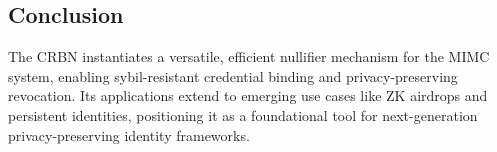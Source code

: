 \subsection{Conclusion}
The CRBN instantiates a versatile, efficient nullifier mechanism for the MIMC system, enabling sybil-resistant credential binding and privacy-preserving revocation. Its applications extend to emerging use cases like ZK airdrops and persistent identities, positioning it as a foundational tool for next-generation privacy-preserving identity frameworks.














% 
% 
% 
% 

